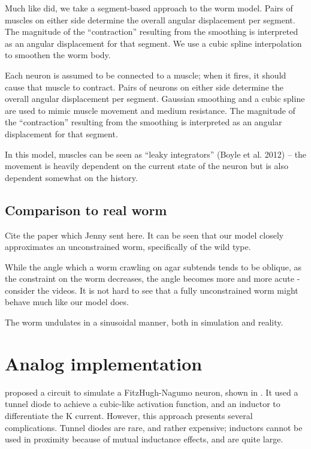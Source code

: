 \documentclass[
    11pt,
]{article}
\begin{document}
Much like \citet{izquierdo2018} did, we take a segment-based approach to the worm model.  Pairs of muscles on either side determine the overall angular displacement per segment.  The magnitude of the “contraction” resulting from the smoothing is interpreted as an angular displacement for that segment.  We use a cubic spline interpolation to smoothen the worm body.

Each neuron is assumed to be connected to a muscle; when it fires, it should cause that muscle to contract.
Pairs of neurons on either side determine the overall angular displacement per segment.
Gaussian smoothing and a cubic spline are used to mimic muscle movement and medium resistance.
The magnitude of the “contraction” resulting from the smoothing is interpreted as an angular displacement for that segment.

In this model, muscles can be seen as “leaky integrators” (Boyle et al. 2012) – the movement is heavily dependent on the current state of the neuron but is also dependent somewhat on the history.

\subsection{Comparison to real worm}

Cite the paper which Jenny sent here.  It can be seen that our model closely approximates an unconstrained worm, specifically of the wild type.

While the angle which a worm crawling on agar subtends tends to be oblique, as the constraint on the worm decreases, the angle becomes more and more acute - consider the videos.  It is not hard to see that a fully unconstrained worm might behave much like our model does.

The worm undulates in a sinusoidal manner, both in simulation and reality.


\section{Analog implementation}

\citet{nagumo1962} proposed a circuit to simulate a FitzHugh-Nagumo neuron, shown in .  It used a tunnel diode to achieve a cubic-like activation function, and an inductor to differentiate the K current.  However, this approach presents several complications.  Tunnel diodes are rare, and rather expensive; inductors cannot be used in proximity because of mutual inductance effects, and are quite large.
\end{document}

